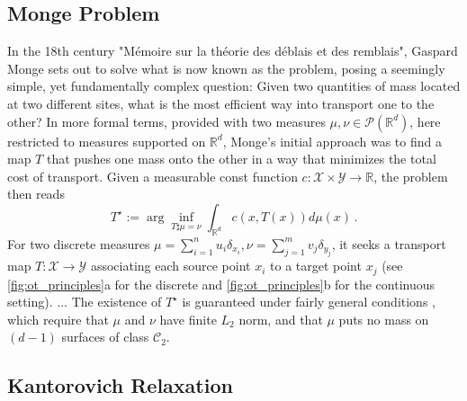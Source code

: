 \subsection{Monge Problem} \label{sec:background_monge}

In the 18th century "M{\'e}moire sur la th{\'e}orie des d{\'e}blais et des remblais", Gaspard Monge sets out to solve what is now known as the \citeauthor{monge1781histoire} problem, posing a seemingly simple, yet fundamentally complex question: Given two quantities of mass located at two different sites, what is the most efficient way into transport one to the other?
In more formal terms, provided with two measures $\mu, \nu\in \mathcal{P}(\mathbb{R}^d)$, here restricted to measures supported on $\mathbb{R}^d$, Monge's initial approach was to find a map $T$ that pushes one mass onto the other in a way that minimizes the total cost of transport.
Given a measurable const function $c: \mathcal{X} \times \mathcal{Y} \rightarrow \mathbb{R}$, the \citeauthor{monge1781histoire} problem then reads
\begin{equation}\label{eq:monge}
T^\star := \arg\inf_{T\sharp\mu=\nu}\int_{\mathbb{R}^d} c(x, T(x)) d\mu(x)\,.
\end{equation}
For two discrete measures $\mu=\sum_{i=1}^n u_i \delta_{x_{i}}, \nu=\sum_{j=1}^m v_j \delta_{y_{j}}$, it seeks a transport map $T: \mathcal{X} \rightarrow \mathcal{Y}$ associating each source point $x_i$ to a target point $x_j$ (see \cref{fig:ot_principles}a for the discrete and \cref{fig:ot_principles}b for the continuous setting).
...
The existence of $T^\star$ is guaranteed under fairly general conditions \citep[Theorem 1.22]{santambrogio2015optimal}, which require that $\mu$ and $\nu$ have finite $L_2$ norm, and that $\mu$ puts no mass on $(d-1)$ surfaces of class $\mathcal{C}_2$.


\subsection{Kantorovich Relaxation} \label{sec:background_kantorovich}

